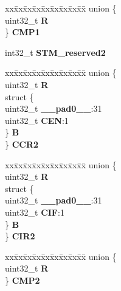 \begin{DoxyCompactItemize}
\begin{tabbing}
\end{tabbing}\item 
\mbox{\label{structSTM__tag_a9649a5f73faa68cebfcc08f7d376fc59}} 
\begin{tabbing}
xx\=xx\=xx\=xx\=xx\=xx\=xx\=xx\=xx\=\kill
union \{\\
\>uint32\_t {\bfseries R}\\
\} {\bfseries CMP1}\\

\end{tabbing}\item 
\mbox{\label{structSTM__tag_aa28740fa0279003171db22b6f71fa85c}} 
int32\+\_\+t {\bfseries S\+T\+M\+\_\+reserved2}
\item 
\mbox{\label{structSTM__tag_adc92d42545584bd9467168cc14199cb5}} 
\begin{tabbing}
xx\=xx\=xx\=xx\=xx\=xx\=xx\=xx\=xx\=\kill
union \{\\
\>uint32\_t {\bfseries R}\\
\>struct \{\\
\>\>uint32\_t {\bfseries \_\_pad0\_\_}:31\\
\>\>uint32\_t {\bfseries CEN}:1\\
\>\} {\bfseries B}\\
\} {\bfseries CCR2}\\

\end{tabbing}\item 
\mbox{\label{structSTM__tag_a06f9a7bd74ab5615b3343a2c712deafe}} 
\begin{tabbing}
xx\=xx\=xx\=xx\=xx\=xx\=xx\=xx\=xx\=\kill
union \{\\
\>uint32\_t {\bfseries R}\\
\>struct \{\\
\>\>uint32\_t {\bfseries \_\_pad0\_\_}:31\\
\>\>uint32\_t {\bfseries CIF}:1\\
\>\} {\bfseries B}\\
\} {\bfseries CIR2}\\

\end{tabbing}\item 
\mbox{\label{structSTM__tag_ace84986c088347cfdf6b5241fe7612f2}} 
\begin{tabbing}
xx\=xx\=xx\=xx\=xx\=xx\=xx\=xx\=xx\=\kill
union \{\\
\>uint32\_t {\bfseries R}\\
\} {\bfseries CMP2}\\


\end{tabbing}
\end{DoxyCompactItemize}
